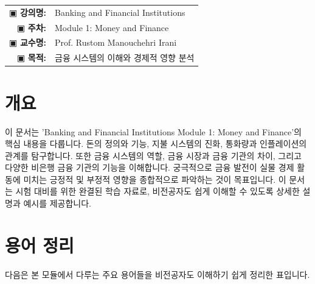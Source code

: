 \documentclass[11pt,a4paper]{article}
\makeatletter
\theoremstyle{definition}
\newcommand{\metainfo}[4]{
\begin{tcolorbox}[
    colback=lightpurple,
    colframe=darkpurple,
    boxrule=1pt,
    arc=2mm,
    left=10pt,
    right=10pt,
    top=8pt,
    bottom=8pt
]
\begin{tabular}{@{}rl@{}}
▣ \textbf{강의명:} & #1 \\[0.3em]
▣ \textbf{주차:} & #2 \\[0.3em]
▣ \textbf{교수명:} & #3 \\[0.3em]
▣ \textbf{목적:} & \begin{minipage}[t]{0.75\textwidth}#4\end{minipage}
\end{tabular}
\end{tcolorbox}
}
\makeatother
\begin{document}
\thispagestyle{firstpage}

\metainfo{Banking and Financial Institutions}{Module 1: Money and Finance}{Prof. Rustom Manouchehri Irani}{금융 시스템의 이해와 경제적 영향 분석}

\tableofcontents

\newpage

\section{개요}
이 문서는 'Banking and Financial Institutions Module 1: Money and Finance'의 핵심 내용을 다룹니다.
돈의 정의와 기능, 지불 시스템의 진화, 통화량과 인플레이션의 관계를 탐구합니다.
또한 금융 시스템의 역할, 금융 시장과 금융 기관의 차이, 그리고 다양한 비은행 금융 기관의 기능을 이해합니다.
궁극적으로 금융 발전이 실물 경제 활동에 미치는 긍정적 및 부정적 영향을 종합적으로 파악하는 것이 목표입니다.
이 문서는 시험 대비를 위한 완결된 학습 자료로, 비전공자도 쉽게 이해할 수 있도록 상세한 설명과 예시를 제공합니다.

\newpage
\section{용어 정리}
다음은 본 모듈에서 다루는 주요 용어들을 비전공자도 이해하기 쉽게 정리한 표입니다.
\end{document}
